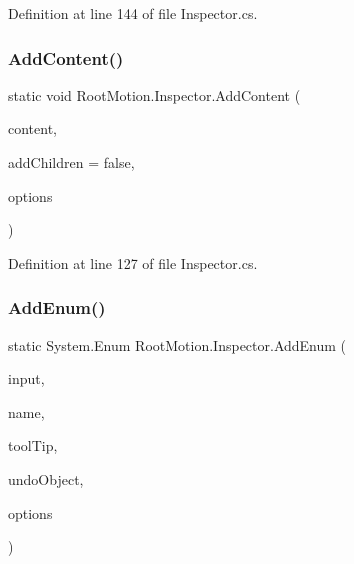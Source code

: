 Definition at line 144 of file Inspector.\+cs.

\mbox{\label{class_root_motion_1_1_inspector_a7ef3d167347b2a99dc1797a709534339}} 
\subsubsection{\texorpdfstring{Add\+Content()}{AddContent()}}
{\footnotesize\ttfamily static void Root\+Motion.\+Inspector.\+Add\+Content (\begin{DoxyParamCaption}\item[{\mbox{\hyperlink{struct_root_motion_1_1_serialized_content}{Serialized\+Content}}}]{content,  }\item[{bool}]{add\+Children = {\ttfamily false},  }\item[{params G\+U\+I\+Layout\+Option \mbox{[}$\,$\mbox{]}}]{options }\end{DoxyParamCaption})\hspace{0.3cm}{\ttfamily [static]}}



Definition at line 127 of file Inspector.\+cs.

\mbox{\label{class_root_motion_1_1_inspector_afcbc550e7f3c44cfa75b3d654cca3ab6}} 
\subsubsection{\texorpdfstring{Add\+Enum()}{AddEnum()}}
{\footnotesize\ttfamily static System.\+Enum Root\+Motion.\+Inspector.\+Add\+Enum (\begin{DoxyParamCaption}\item[{System.\+Enum}]{input,  }\item[{string}]{name,  }\item[{string}]{tool\+Tip,  }\item[{\mbox{\hyperlink{_quads_8cs_aef19bab18b9814edeef255c43e4f6bbc}{Object}}}]{undo\+Object,  }\item[{params G\+U\+I\+Layout\+Option \mbox{[}$\,$\mbox{]}}]{options }\end{DoxyParamCaption})\hspace{0.3cm}{\ttfamily [static]}}



